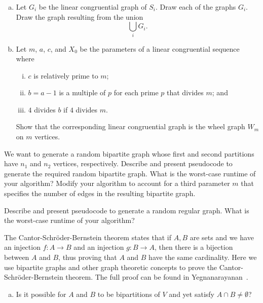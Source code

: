 \begin{problem}
\begin{enumerate}[(a)]
  \item Let $G_i$ be the linear congruential graph of $S_i$. Draw each
    of the graphs $G_i$. Draw the graph resulting from the union
    \[
    \bigcup_i G_i.
    \]

  \item Let $m$, $a$, $c$, and $X_0$ be the parameters of a linear
    congruential sequence where
    \begin{enumerate}[(i)]
    \item $c$ is relatively prime to $m$;

    \item $b = a - 1$ is a multiple of $p$ for each prime $p$ that
      divides $m$; and

    \item $4$ divides $b$ if $4$ divides $m$.
    \end{enumerate}
    Show that the corresponding linear congruential graph is the wheel
    graph $W_m$ on $m$ vertices.
  \end{enumerate}

\item We want to generate a random bipartite
  graph whose first and second partitions have $n_1$
  and $n_2$ vertices, respectively. Describe and present pseudocode to
  generate the required random
  bipartite graph. What is the worst-case
  runtime of your algorithm? Modify your algorithm to account for a
  third parameter $m$ that specifies the number of edges in the
  resulting bipartite graph.

\item Describe and present pseudocode to generate a
  random regular
  graph. What is the worst-case runtime of your algorithm?

\item The
  Cantor-Schr\"oder-Bernstein
  theorem states that if $A,B$ are sets and we have an injection
  $f: A \to B$ and an injection $g: B \to A$, then there is a
  bijection between $A$ and $B$, thus proving that $A$ and $B$ have
  the same cardinality. Here we use bipartite
  graphs and other graph theoretic concepts to prove the
  Cantor-Schr\"oder-Bernstein theorem. The full proof can be found in
  Yegnanarayanan~\cite{Yegnanarayanan2005}.
  \begin{enumerate}[(a)]
  \item Is it possible for $A$ and $B$ to be bipartitions of $V$ and
    yet satisfy $A \cap B \neq \emptyset$?


\end{enumerate}
\end{problem}
